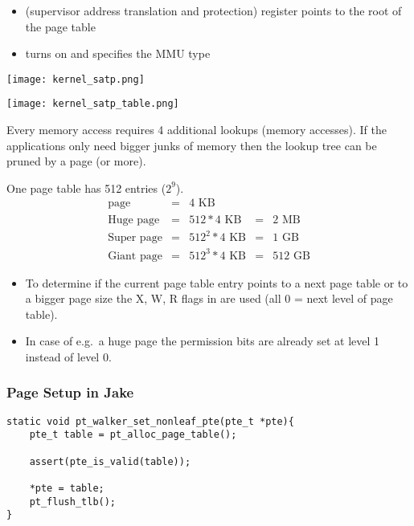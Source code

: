\newpar{}
\begin{itemize}
    \item {} (supervisor address translation and protection) register points to the root of the page table
    \item {} turns on and specifies the MMU type
\end{itemize}
\begin{center}
    \texttt{[image: kernel\_satp.png]}
\end{center}
\begin{center}
    \texttt{[image: kernel\_satp\_table.png]}
\end{center}

\newpar{}

Every memory access requires 4 additional lookups (memory accesses). If the applications only need bigger junks of memory then the lookup tree can be pruned by a page (or more).

\newpar{}
One page table has 512 entries ($2^9$).
\begin{align*}
    \text{page}       & = & 4\text{~KB}         &   &               \\
    \text{Huge page}  & = & 512 * 4\text{~KB}   & = & 2\text{~MB}   \\
    \text{Super page} & = & 512^2 * 4\text{~KB} & = & 1\text{~GB}   \\
    \text{Giant page} & = & 512^3 * 4\text{~KB} & = & 512\text{~GB}
\end{align*}

\begin{itemize}
    \item To determine if the current page table entry points to a next page table or to a bigger page size the X, W, R flags in are used (all 0 = next level of page table).
    \item In case of e.g.\ a huge page the permission bits are already set at level 1 instead of level 0.
\end{itemize}

\subsubsection{Page Setup in Jake}

\newpar{}
\begin{lstlisting}[style=bright_C++]
static void pt_walker_set_nonleaf_pte(pte_t *pte){
    pte_t table = pt_alloc_page_table();

    assert(pte_is_valid(table));

    *pte = table;
    pt_flush_tlb();
}
\end{lstlisting}

